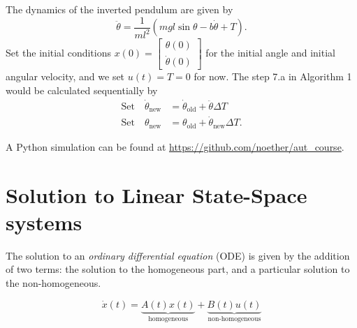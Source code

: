 The dynamics of the inverted pendulum are given by
\begin{equation}
	\ddot\theta = \frac{1}{ml^2}\left(mgl\sin{\theta}-b\dot\theta + T\right). \nonumber
\end{equation}
Set the initial conditions $x(0) = \begin{bmatrix}\theta(0) \\ \dot\theta(0) \end{bmatrix}$ for the initial angle and initial angular velocity, and we set $u(t) = T = 0$ for now. The step 7.a in Algorithm 1 would be calculated sequentially by
\begin{align}
	\text{Set} \quad \dot\theta_{\text{new}} &= \dot\theta_{\text{old}} + \ddot\theta \Delta T \nonumber \\
	\text{Set} \quad \theta_{\text{new}} &= \theta_{\text{old}} + \dot\theta_{\text{new}} \Delta T. \nonumber
\end{align}

A Python simulation can be found at \url{https://github.com/noether/aut_course}.

\section{Solution to Linear State-Space systems}
The solution to an \emph{ordinary differential equation} (ODE) is given by the addition of two terms: the solution to the homogeneous part, and a particular solution to the non-homogeneous.

\begin{equation}
	\dot x(t) = \underbrace{A(t)x(t)}_{\text{homogeneous}} + \underbrace{B(t)u(t)}_{\text{non-homogeneous}}
	\label{eq: xdyn}
\end{equation}

